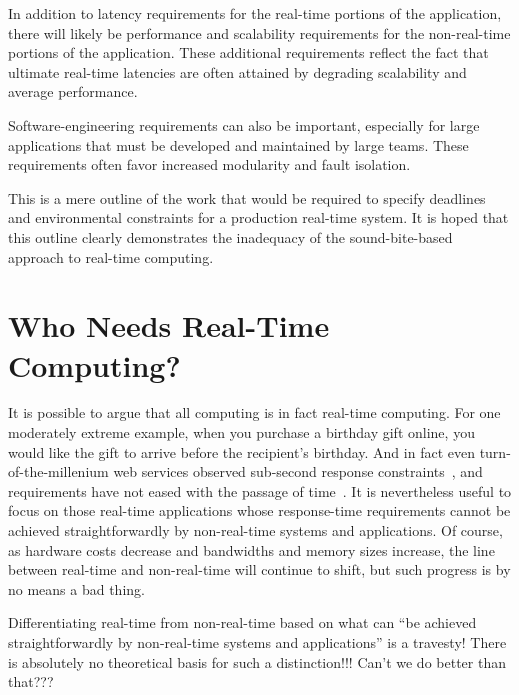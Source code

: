 In addition to latency requirements for the real-time portions of the
application, there will likely be performance and scalability requirements
for the non-real-time portions of the application.
These additional requirements reflect the fact that ultimate real-time
latencies are often attained by degrading scalability and average performance.

Software-engineering requirements can also be important, especially for
large applications that must be developed and maintained by large teams.
These requirements often favor increased modularity and fault isolation.

This is a mere outline of the work that would be required to specify
deadlines and environmental constraints for a production real-time system.
It is hoped that this outline clearly demonstrates the inadequacy of
the sound-bite-based approach to real-time computing.

\section{Who Needs Real-Time Computing?}
\label{sec:rt:Who Needs Real-Time Computing?}

It is possible to argue that all computing is in fact real-time computing.
For one moderately extreme example, when you purchase a birthday gift online,
you would like the gift to arrive before the recipient's birthday.
And in fact even turn-of-the-millenium web services observed sub-second
response constraints~\cite{KristofferBohmann2001a}, and requirements have
not eased with the passage of time~\cite{DeCandia:2007:DAH:1323293.1294281}.
It is nevertheless useful to focus on those real-time applications
whose response-time requirements cannot be achieved straightforwardly
by non-real-time systems and applications.
Of course, as hardware costs decrease and bandwidths and memory sizes
increase, the line between real-time and non-real-time will continue
to shift, but such progress is by no means a bad thing.

\QuickQuiz{}
	Differentiating real-time from non-real-time based on what can
	``be achieved straightforwardly by non-real-time systems and
	applications'' is a travesty!
	There is absolutely no theoretical basis for such a distinction!!!
	Can't we do better than that???
 \QuickQuizEnd

